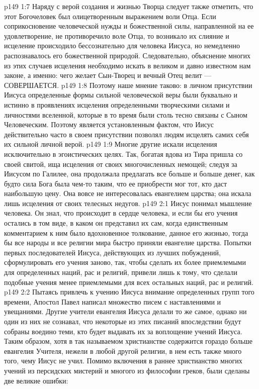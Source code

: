 \vs p149 1:7 \pc {}\bibnobreakspace Наряду с верой создания и жизнью Творца следует также отметить, что этот Богочеловек был олицетворенным выражением воли Отца. Если соприкосновение человеческой нужды и божественной силы, направленной на ее удовлетворение, не противоречило воле Отца, то возникало их слияние и исцеление происходило бессознательно для человека Иисуса, но немедленно распознавалось его божественной природой. Следовательно, объяснение многих из этих случаев исцеления необходимо искать в великом и давно известном нам законе, а именно: чего желает Сын\hyp{}Творец и вечный Отец велит --- СОВЕРШАЕТСЯ.
\vs p149 1:8 \pc Поэтому наше мнение таково: в личном присутствии Иисуса определенные формы сильной человеческой веры были буквально и истинно  в проявлениях исцеления определенными творческими силами и личностями вселенной, которые в то время были столь тесно связаны с Сыном Человеческим. Поэтому является установленным фактом, что Иисус действительно часто в своем присутствии позволял людям исцелять самих себя их сильной личной верой.
\vs p149 1:9 Многие другие искали исцеления исключительно в эгоистических целях. Так, богатая вдова из Тира пришла со своей свитой, ища исцеления от своих многочисленных немощей; следуя за Иисусом по Галилее, она продолжала предлагать все больше и больше денег, как будто сила Бога была чем\hyp{}то таким, что ее приобрести мог тот, кто даст наибольшую цену. Она вовсе не интересовалась евангелием царства; она искала лишь исцеления от своих телесных недугов.
\vs p149 2:1 Иисус понимал мышление человека. Он знал, что происходит в сердце человека, и если бы его учения остались в том виде, в каком он представил их сам, когда единственным комментарием к ним было вдохновенное толкование, данное его жизнью, тогда бы все народы и все религии мира быстро приняли евангелие царства. Попытки первых последователей Иисуса, действующих из лучших побуждений, сформулировать его учения заново, так, чтобы сделать их более приемлемыми для определенных наций, рас и религий, привели лишь к тому, что сделали подобные учения менее приемлемыми для всех остальных наций, рас и религий.
\vs p149 2:2 Пытаясь привлечь к учению Иисуса внимание определенных групп того времени, Апостол Павел написал множество писем с наставлениями и увещаниями. Другие учители евангелия Иисуса делали то же самое, однако ни один из них не сознавал, что некоторые из этих писаний впоследствии будут собраны воедино теми, кто будет выдавать их за воплощение учений Иисуса. Таким образом, хотя в так называемом христианстве содержится гораздо больше евангелия Учителя, нежели в любой другой религии, в нем есть также много того, чему Иисус не учил. Помимо включения в раннее христианство многих учений из персидских мистерий и многого из философии греков, были сделаны две великие ошибки:
